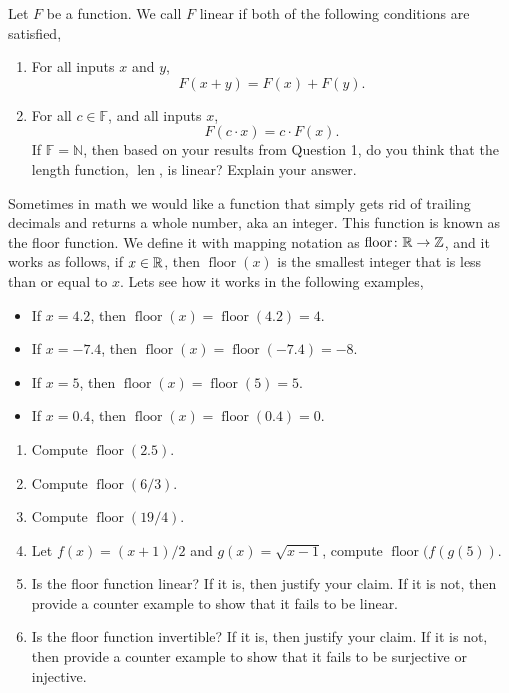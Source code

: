 \documentclass[12pt]{article} %
\begin{document}
\begin{qstn}
\begin{qstn}
  Let $F$ be a function. We call $F$ linear if both of the following conditions are satisfied,
  \begin{enumerate}
    \item For all inputs $x$ and $y$, 
      \[
          F(x+y) = F(x) + F(y)
      .\] 
    \item For all $c \in \mathbb F$, and all inputs $x$,
       \[
          F(c\cdot x) = c\cdot F(x)
      .\] 
  If $\mathbb F = \mathbb N$, then based on your results from Question 1, do you think that the length function, 
  $ \operatorname{len}$, is linear?
  Explain your answer.
  \end{enumerate}

\end{qstn}

\newpage

\begin{qstn}
  Sometimes in math we would like a function that simply gets rid of trailing decimals and returns a whole number,
  aka an integer. This function is known as the floor function. We define it with mapping notation as $ \operatorname{floor} \colon
  \mathbb R \to \mathbb Z$, and it works as follows, if $x \in \mathbb R$, then $\operatorname{floor}(x)$ is the
  smallest integer that is less than or equal to $x$.
  Lets see how it works in the following examples,
  \begin{itemize}
    \item If $x = 4.2$, then $\operatorname{floor}(x) = \operatorname{floor}(4.2) =  4$.
    \item If $x = -7.4$, then $\operatorname{floor}(x) = \operatorname{floor}(-7.4) = -8$.
    \item If $x = 5$, then $\operatorname{floor}(x) = \operatorname{floor}(5) =  5$.
    \item If $x = 0.4$, then $\operatorname{floor}(x) = \operatorname{floor}(0.4) =  0$.
  \end{itemize}
\end{qstn}
\begin{enumerate}[label=(\alph*)]
  \item Compute $ \operatorname{floor}(2.5)$.
  \item Compute $ \operatorname{floor}(6 / 3)$.
  \item Compute $ \operatorname{floor}(19 / 4)$.
  \item Let $f(x) = (x + 1) / 2$ and $g(x) = \sqrt{x - 1}$, compute $ \operatorname{floor}(f(g(5))$.
  \item Is the floor function linear? If it is, then justify your claim. If it is not, then provide a counter example to
        show that it fails to be linear.
  \item Is the floor function invertible? If it is, then justify your claim. If it is not, then provide a counter example to
        show that it fails to be surjective or injective. 
\end{enumerate}



\end{qstn}
\end{document}
